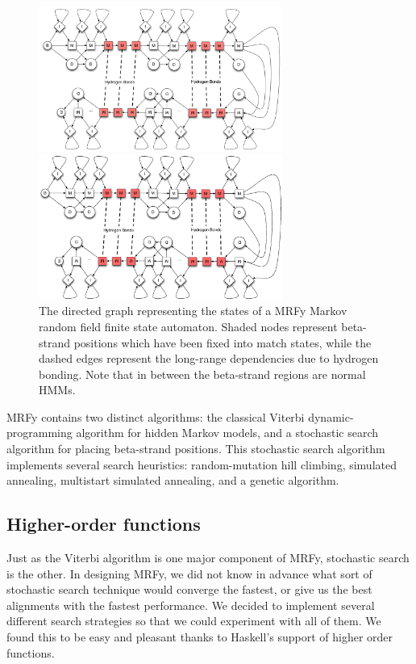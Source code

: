 \documentclass[preprint,nonatbib,blockstyle,nocopyrightspace,times]{sigplanconf}
\begin{document}
\begin{figure}[h!] 
\ifpdfmadness
\centerline{\includegraphics[width=8cm]{mrf_interleave_diagram.pdf}} 
\else
\centerline{\includegraphics[width=8cm]{mrf_interleave_diagram.eps}} 
\fi
\caption{The directed graph representing the states of a MRFy Markov random 
field finite state automaton.
Shaded nodes represent beta-strand positions which have been fixed into match states, 
while the dashed edges represent the long-range dependencies due to hydrogen 
bonding.
Note that in between the beta-strand regions are normal HMMs.}\label{mrf} \end{figure}


MRFy contains two distinct algorithms: the classical Viterbi 
dynamic-programming algorithm for hidden Markov models, and a stochastic search 
algorithm for placing beta-strand positions.
This stochastic search algorithm 
implements several search heuristics: random-mutation hill climbing, simulated 
annealing, multistart simulated annealing, and a genetic algorithm.


\subsection{Higher-order functions}

Just as the Viterbi algorithm is one major component of MRFy, stochastic search 
is the other.
In designing MRFy, we did not know in advance what sort of 
stochastic search technique would converge the fastest, or give us the best 
alignments with the fastest performance.
We decided to implement several 
different search strategies so that we could experiment with all of them.
We 
found this to be easy and pleasant thanks to Haskell's support of higher order 
functions.
\end{document}
